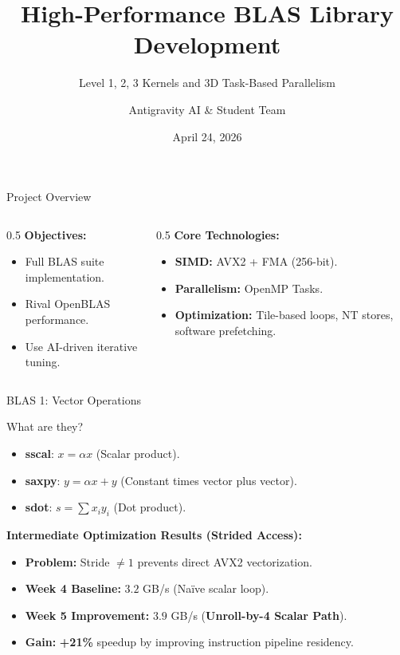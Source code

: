 \documentclass[aspectratio=169]{beamer}
\title[BLAS Optimization Week 5 \& 6]{High-Performance BLAS Library Development}
\subtitle{Level 1, 2, 3 Kernels and 3D Task-Based Parallelism}
\author{Antigravity AI \& Student Team}
\date{April 24, 2026}
\begin{document}
\begin{frame}
  \titlepage
\end{frame}

\begin{frame}{Project Overview}
  \begin{columns}
    \begin{column}{0.5\textwidth}
      \textbf{Objectives:}
      \begin{itemize}
        \item Full BLAS suite implementation.
        \item Rival OpenBLAS performance.
        \item Use AI-driven iterative tuning.
      \end{itemize}
    \end{column}
    \begin{column}{0.5\textwidth}
      \textbf{Core Technologies:}
      \begin{itemize}
        \item \textbf{SIMD:} AVX2 + FMA (256-bit).
        \item \textbf{Parallelism:} OpenMP Tasks.
        \item \textbf{Optimization:} Tile-based loops, NT stores, software prefetching.
      \end{itemize}
    \end{column}
  \end{columns}
\end{frame}

\begin{frame}{BLAS 1: Vector Operations}
  \begin{block}{What are they?}
    \begin{itemize}
      \item \textbf{sscal}: $x = \alpha x$ (Scalar product).
      \item \textbf{saxpy}: $y = \alpha x + y$ (Constant times vector plus vector).
      \item \textbf{sdot}: $s = \sum x_i y_i$ (Dot product).
    \end{itemize}
  \end{block}
  \textbf{Intermediate Optimization Results (Strided Access):}
  \begin{itemize}
    \item \textbf{Problem:} Stride $\neq 1$ prevents direct AVX2 vectorization.
    \item \textbf{Week 4 Baseline:} $3.2$ GB/s (Naïve scalar loop).
    \item \textbf{Week 5 Improvement:} $3.9$ GB/s (\textbf{Unroll-by-4 Scalar Path}).
    \item \textbf{Gain:} \textbf{+21\%} speedup by improving instruction pipeline residency.
  \end{itemize}
\end{frame}
\end{document}
